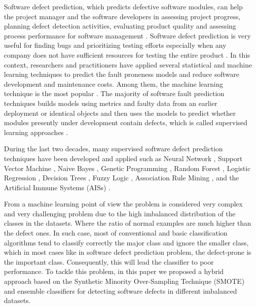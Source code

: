 \documentclass[runningheads,a4paper]{llncs}
\begin{document}
Software defect prediction, which predicts defective software modules, can help the project manager and the software developers in assessing project progress, planning defect detection activities, evaluating product quality and assessing process performance for software management \cite{clark2001good}. Software defect prediction is very useful for finding bugs and prioritizing testing efforts especially when any company does not have sufficient resources for testing the entire product \cite{abaei2014survey,wang2016automatically}. In this context, researchers and practitioners have applied several statistical and machine learning techniques to predict the fault proneness models and reduce software development and maintenance costs. Among them, the machine learning technique is the most popular \cite{rawat2012software}. The majority of software fault prediction techniques builds models using metrics and faulty data from an earlier deployment or identical objects and then uses the models to predict whether modules presently under development contain defects, which is called supervised learning approaches \cite{abaei2014survey}.

During the last two decades, many supervised software defect prediction techniques have been developed and applied such as Neural Network \cite{quah2003application}, Support Vector Machine \cite{elish2008predicting}, Naive Bayes \cite{menzies2007data}, Genetic Programming \cite{evett1998gp}, Random Forest \cite{koru2005building}, Logistic Regression \cite{suffian2014prediction}, Decision Trees \cite{koprinska2007learning}, Fuzzy Logic \cite{yuan2000application}, Association Rule Mining \cite{czibula2014software}, and the Artificial Immune Systems (AISs) \cite{catal2007software,catal2008fault}. 




 
 From a machine learning point of view the problem is considered very complex and very challenging problem due to the high imbalanced distribution of the classes in the datasets. Where the ratio of normal examples are much higher than the defect ones. In such case, most of conventional and basic classification algorithms tend to classify correctly the major class and ignore the smaller class, which in most cases like in software defect prediction problem, the defect-prone is the important class. Consequently, this will lead the classifier to poor performance. To tackle this problem, in this paper we proposed a hybrid approach based on the Synthetic Minority Over-Sampling Technique (SMOTE) and ensemble classifiers for detecting software defects in different imbalanced datasets.
 
\end{document}
